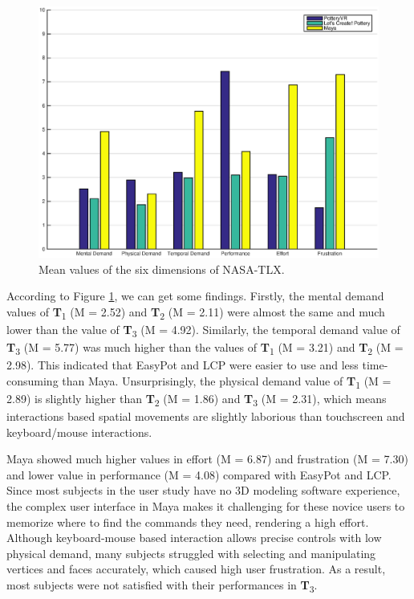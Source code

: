 \documentclass{svjour3}                     %
\begin{document}
\begin{figure}
	\includegraphics[width=\textwidth]{tlx.eps}
	\caption{Mean values of the six dimensions of NASA-TLX.}
	\label{fig:tlx}
\end{figure}

According to Figure \ref{fig:tlx}, we can get some findings. 
Firstly, the mental demand values of \textbf{T}\textsubscript{1} (M = 2.52) and \textbf{T}\textsubscript{2} (M = 2.11) were almost the same and much lower than the value of \textbf{T}\textsubscript{3} (M = 4.92). Similarly, the temporal demand value of \textbf{T}\textsubscript{3} (M = 5.77) was much higher than the values of \textbf{T}\textsubscript{1} (M = 3.21) and \textbf{T}\textsubscript{2} (M = 2.98). This indicated that EasyPot and LCP were easier to use and less time-consuming than Maya. Unsurprisingly, the physical demand value of \textbf{T}\textsubscript{1} (M = 2.89) is slightly higher than \textbf{T}\textsubscript{2} (M = 1.86) and \textbf{T}\textsubscript{3} (M = 2.31), which means interactions based spatial movements are slightly laborious than touchscreen and keyboard/mouse interactions.

Maya showed much higher values in effort (M = 6.87) and frustration (M = 7.30) and lower value in performance (M = 4.08) compared with EasyPot and LCP.
Since most subjects in the user study have no 3D modeling software experience, the complex user interface in Maya makes it challenging for these novice users to memorize where to find the commands they need, rendering a high effort.
Although keyboard-mouse based interaction allows precise controls with low physical demand, many subjects struggled with selecting and manipulating vertices and faces accurately, which caused high user frustration. As a result, most subjects were not satisfied with their performances in \textbf{T}\textsubscript{3}.
\end{document}
